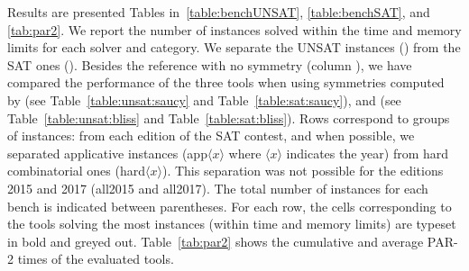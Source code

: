 Results are presented Tables in~\ref{table:benchUNSAT}, \ref{table:benchSAT},
and \ref{tab:par2}. We report the number of instances solved within the time
and memory limits for each solver and category. We separate the UNSAT instances
() from the SAT ones (). Besides
the reference with no symmetry (column \minisat{}), we have compared the
performance of the three tools when using symmetries computed by \saucy{} (see
Table~\ref{table:unsat:saucy} and Table~\ref{table:sat:saucy}), and \bliss{}
(see Table~\ref{table:unsat:bliss} and Table~\ref{table:sat:bliss}). Rows
correspond to groups of instances: from each edition of the SAT contest, and
when possible, we separated applicative instances (app$\langle x \rangle$ where
$\langle x \rangle$ indicates the year) from hard combinatorial ones
(hard$\langle x \rangle$). This separation was not possible for the editions
2015 and 2017 (all2015 and all2017). The total number of instances for each
bench is indicated between parentheses. For each row, the cells corresponding
to the tools solving the most instances (within time and memory limits) are
typeset in bold and greyed out. Table~\ref{tab:par2} shows the cumulative and
average PAR-2 times of the evaluated tools.

